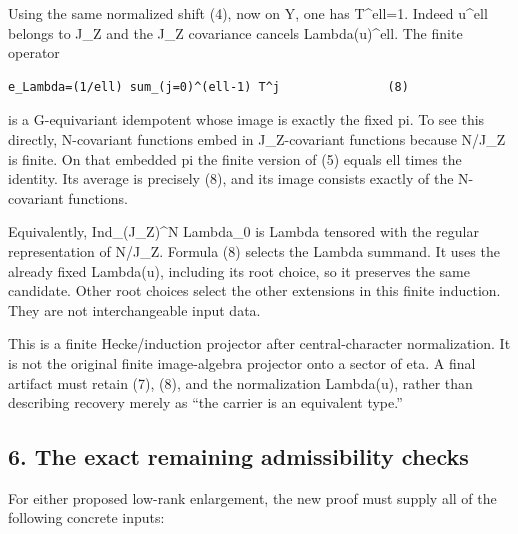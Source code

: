 Using the same normalized shift (4), now on Y, one has T\^{}ell=1.
Indeed u\^{}ell belongs to J\_Z and the J\_Z covariance cancels
Lambda(u)\^{}ell. The finite operator

\begin{Verbatim}[fontsize=\small,breaklines=true,breakanywhere=true]
e_Lambda=(1/ell) sum_(j=0)^(ell-1) T^j               (8)
\end{Verbatim}

is a G-equivariant idempotent whose image is exactly the fixed pi. To
see this directly, N-covariant functions embed in J\_Z-covariant
functions because N/J\_Z is finite. On that embedded pi the finite
version of (5) equals ell times the identity. Its average is precisely
(8), and its image consists exactly of the N-covariant functions.

Equivalently, Ind\_(J\_Z)\^{}N Lambda\_0 is Lambda tensored with the
regular representation of N/J\_Z. Formula (8) selects the Lambda summand.
It uses the already fixed Lambda(u), including its root choice, so it
preserves the same candidate. Other root choices select the other
extensions in this finite induction. They are not interchangeable input
data.

This is a finite Hecke/induction projector after central-character
normalization. It is not the original finite image-algebra projector
onto a sector of eta. A final artifact must retain (7), (8), and the
normalization Lambda(u), rather than describing recovery merely as ``the
carrier is an equivalent type.''

\hypertarget{lowrank_contract-the-exact-remaining-admissibility-checks}{%
\subsection{6. The exact remaining admissibility
checks}\label{lowrank_contract-the-exact-remaining-admissibility-checks}}

For either proposed low-rank enlargement, the new proof must supply all
of the following concrete inputs:

